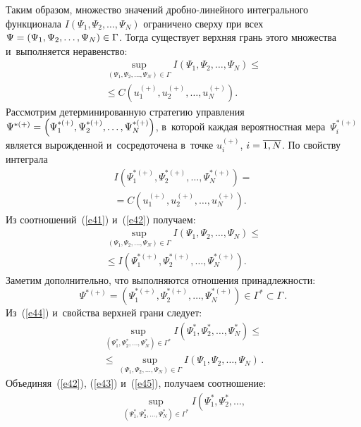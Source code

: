 \begin{multicols}{2}
Таким образом, множество значений дроб\-но-ли\-ней\-но\-го интегрального 
функционала $I(\Psi_1, \Psi_2,\ldots, \Psi_N)$ ограничено сверху при всех 
$\Psi\hm=(\Psi_1, \Psi_2,\ldots, \Psi_N)\hm\in \Gamma$. Тогда существует верхняя 
грань этого множества и~выполняется неравенство:
\begin{multline}
\sup\limits_{(\Psi_1, \Psi_2,\ldots, \Psi_N)\in \Gamma} 
I\left(\Psi_1, \Psi_2,\ldots, \Psi_N\right)\leq {}\\
{}\leq
C\left(u^{(+)}_1,u^{(+)}_2,\ldots,u^{(+)}_N\right). \label{e41}
\end{multline}
Рассмотрим детерминированную стратегию управ\-ле\-ния 
$\Psi^{*(+)}\hm=\left(\Psi_1^{*(+)}, \Psi_2^{*(+)},\ldots, \Psi_N^{*(+)}\right)$, 
в~которой каждая вероятностная мера~$\Psi_i^{*(+)}$ является вы\-рож\-ден\-ной 
и~сосредоточена в~точке $u_i^{(+)}$, $i\hm=\overline{1, N}$.
По свойству интеграла
\begin{multline}
I\left(\Psi_1^{*(+)}, \Psi_2^{*(+)},\ldots ,\Psi_N^{*(+)}\right)={}\\
{}=
C\left(u^{(+)}_1,u^{(+)}_2,\ldots,u^{(+)}_N\right). \label{e42}
\end{multline}
Из соотношений~(\ref{e41}) и~(\ref{e42}) получаем:
\begin{multline}
\sup\limits_{(\Psi_1, \Psi_2,\ldots, \Psi_N)\in \Gamma} 
I\left(\Psi_1, \Psi_2,\ldots, \Psi_N\right)\leq{}\\
{}\leq
 I\left(\Psi_1^{*(+)}, 
\Psi_2^{*(+)},\ldots, \Psi_N^{*(+)}\right). \label{e43}
\end{multline}
Заметим дополнительно, что выполняются отношения принадлежности:
\begin{equation}
\Psi^{*(+)}=\left(\Psi_1^{*(+)}, \Psi_2^{*(+)},\ldots, \Psi_N^{*(+)}\right) 
\in \Gamma^* \subset \Gamma\,. \label{e44}
\end{equation}
Из~(\ref{e44}) и~свойства верхней грани следует:
\begin{multline}
\sup\limits_{\left(\Psi_1^{*}, \Psi_2^{*},\ldots, \Psi_N^{*}\right) \in \Gamma^*} 
I\left(\Psi_1^{*}, \Psi_2^{*},\ldots, \Psi_N^{*}\right)\leq {}\\
{}\leq
\sup\limits_{\left(\Psi_1, \Psi_2,\ldots, \Psi_N\right) 
\in \Gamma} I\left(\Psi_1, \Psi_2,\ldots, \Psi_N\right)\,. 
\label{e45}
\end{multline}
Объединяя~(\ref{e42}), (\ref{e43}) и~(\ref{e45}), получаем соотношение:
\begin{multline}
\sup\limits_{\left(\Psi_1^{*}, \Psi_2^{*},\ldots, \Psi_N^{*}\right) 
\in \Gamma^*} I\left(\Psi_1^{*}, \Psi_2^{*},\ldots, 

\end{multline}
\end{multicols}
